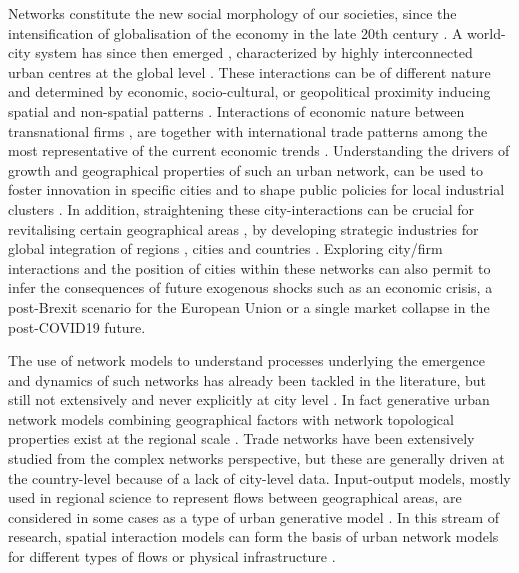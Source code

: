 \documentclass[10pt,letterpaper]{article}
\begin{document}
Networks constitute the new social morphology of our societies, since the intensification of globalisation of the economy in the late 20th century \cite{castells2000networksociety}. A world-city system has since then emerged \cite{taylor2001specification}, characterized by highly interconnected urban centres at the global level \cite{sassen1991}. These interactions can be of different nature and determined by economic, socio-cultural, or geopolitical proximity inducing spatial and non-spatial patterns \cite{martinus2018global}. Interactions of economic nature between transnational firms \cite{derudder2018central}, are together with international trade patterns among the most representative of the current economic trends \cite{taylor2001specification}. Understanding the drivers of growth and geographical properties of such an urban network, can be used to foster innovation in specific cities and to shape public policies for local industrial clusters \cite{turkina2016structure}. In addition, straightening these city-interactions can be crucial for revitalising certain geographical areas \cite{Clarke2018}, by developing strategic industries for global integration of regions \cite{dawley2019creating}, cities \cite{gluckler2016relational} and countries \cite{martinus2019brokerage}. Exploring city/firm interactions \cite{storme2019introducing} and the position of cities within these networks \cite{gluckler2016relational} can also permit to infer the consequences of future exogenous shocks such as an economic crisis, a post-Brexit scenario for the European Union or a single market collapse in the post-COVID19 future.

The use of network models to understand processes underlying the emergence and dynamics of such networks has already been tackled in the literature, but still not extensively and never explicitly at city level \cite{taylor2001specification}. In fact generative urban network models combining geographical factors with network topological properties exist at the regional scale {\cite{dai2016simulating}}. Trade networks have been extensively studied from the complex networks perspective, but these are generally driven at the country-level \cite{garlaschelli2005structure} because of a lack of city-level data. Input-output models, mostly used in regional science to represent flows between geographical areas, are considered in some cases as a type of urban generative model \cite{jin1993generation}. In this stream of research, spatial interaction models \cite{dennett2013multilevel} can form the basis of urban network models for different types of flows \cite{dai2016generative} or physical infrastructure \cite{raimbault2018indirect}.
\end{document}

